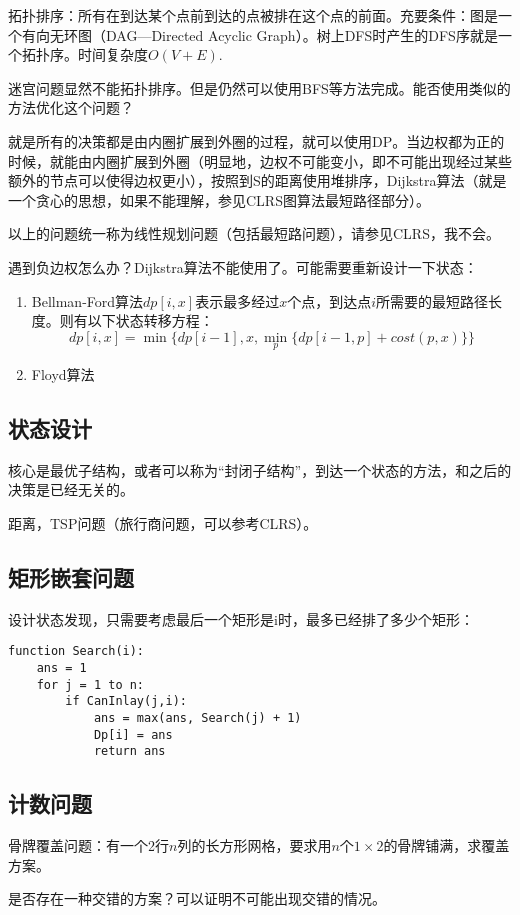 \documentclass{article}
\begin{document}
拓扑排序：所有在到达某个点前到达的点被排在这个点的前面。充要条件：图是一个有向无环图（DAG---Directed Acyclic Graph）。树上DFS时产生的DFS序就是一个拓扑序。时间复杂度$O(V+E)$.

迷宫问题显然不能拓扑排序。但是仍然可以使用BFS等方法完成。能否使用类似的方法优化这个问题？

就是所有的决策都是由内圈扩展到外圈的过程，就可以使用DP。当边权都为正的时候，就能由内圈扩展到外圈（明显地，边权不可能变小，即不可能出现经过某些额外的节点可以使得边权更小），按照到S的距离使用堆排序，Dijkstra算法（就是一个贪心的思想，如果不能理解，参见CLRS图算法最短路径部分）。

以上的问题统一称为线性规划问题（包括最短路问题），请参见CLRS，我不会。

遇到负边权怎么办？Dijkstra算法不能使用了。可能需要重新设计一下状态：
\begin{enumerate}
\item{Bellman-Ford算法}$dp[i,x]$表示最多经过$x$个点，到达点$i$所需要的最短路径长度。则有以下状态转移方程：
\begin{equation*}
dp[i,x]=\min\{dp[i-1],x,\min\limits_p\{dp[i-1,p]+cost(p,x)\}\}
\end{equation*}
\item{Floyd算法}
\end{enumerate}
\subsection{状态设计}
核心是最优子结构，或者可以称为“封闭子结构”，到达一个状态的方法，和之后的决策是已经无关的。

距离，TSP问题（旅行商问题，可以参考CLRS）。
\subsection{矩形嵌套问题}
设计状态发现，只需要考虑最后一个矩形是i时，最多已经排了多少个矩形：
\begin{verbatim}
function Search(i):
    ans = 1
    for j = 1 to n:
        if CanInlay(j,i):
            ans = max(ans, Search(j) + 1)
            Dp[i] = ans
            return ans
\end{verbatim}
\subsection{计数问题}
骨牌覆盖问题：有一个2行$n$列的长方形网格，要求用$n$个$1\times 2$的骨牌铺满，求覆盖方案。

是否存在一种交错的方案？可以证明不可能出现交错的情况。
\end{document}
